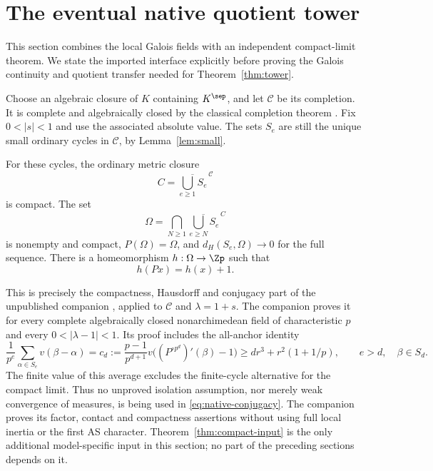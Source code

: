\section{The eventual native quotient tower}\label{sec:tower}

This section combines the local Galois fields with an independent
compact-limit theorem. We state the imported interface explicitly
before proving the Galois continuity and quotient transfer needed
for Theorem~\ref{thm:tower}.

Choose an algebraic closure of \(K\) containing \(K^\sep\), and let
\(\mathcal C\) be its completion. It is complete and algebraically
closed by the classical completion theorem
\cite[Theorem 1.1]{conradcompletion}. Fix \(0<|s|<1\) and use the
associated absolute value. The sets \(S_e\) are still the unique
small ordinary cycles in \(\mathcal C\), by Lemma~\ref{lem:small}.

\begin{theorem}\label{thm:compact-input}
For these cycles, the ordinary metric closure
\[
 C=\overline{\bigcup_{e\ge1}S_e}^{\,\mathcal C}
\]
is compact. The set
\begin{equation}\label{eq:tail-limit}
 \Omega=\bigcap_{N\ge1}
 \overline{\bigcup_{e\ge N}S_e}^{\,C}
\end{equation}
is nonempty and compact, \(P(\Omega)=\Omega\), and
\(d_H(S_e,\Omega)\to0\) for the full sequence.
There is a homeomorphism \(h:\Omega\to\Zp\) such that
\begin{equation}\label{eq:native-conjugacy}
 h(Px)=h(x)+1.
\end{equation}
\end{theorem}

This is precisely the compactness, Hausdorff and conjugacy
part of the unpublished companion
\cite[Theorem 1.1, \emph{Compact adding-machine limit of the optimal
cycles}]{companion2026haar}, applied to \(\mathcal C\) and
\(\lambda=1+s\). The companion proves it for every complete
algebraically closed nonarchimedean field of characteristic \(p\)
and every \(0<|\lambda-1|<1\).
Its proof includes the all-anchor identity
\[
 \frac1{p^e}\sum_{\alpha\in S_e}v(\beta-\alpha)
 =c_d:=\frac{p-1}{p^{d+1}}
 v\bigl((P^{\circ p^d})'(\beta)-1\bigr)
 \ge d r^3+r^2(1+1/p),\qquad e>d,\quad\beta\in S_d.
\]
The finite value of this average excludes the finite-cycle
alternative for the compact limit. Thus no unproved isolation
assumption, nor merely weak convergence of measures, is being
used in \eqref{eq:native-conjugacy}. The companion proves its
factor, contact and compactness assertions without using full
local inertia or the first AS character.
Theorem~\ref{thm:compact-input} is the only additional
model-specific input in this section; no part of the preceding
sections depends on it.

